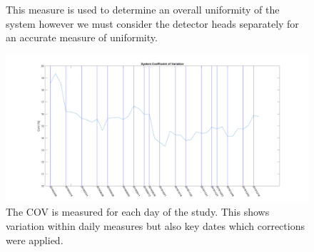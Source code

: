 \begin{figure}[!tbp]
  \centering
  \hfill
  \caption{This measure is used to determine an overall uniformity of the system however we must consider the detector heads separately for an accurate measure of uniformity.}
\end{figure}

\begin{figure}[!t]
\centering
\includegraphics[width=5.5in]{figures/COVSystem.png}

    \caption{The \acrshort{COV} is measured for each day of the study. This shows variation within daily measures but also key dates which corrections were applied.} \label{fig:DailyCOV}
\end{figure}


